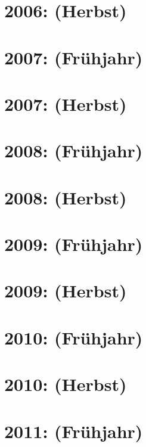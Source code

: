 \documentclass{lehramt-informatik-haupt}
\begin{document}
\section{2006: (Herbst)}


\section{2007: (Frühjahr)}


\section{2007: (Herbst)}


\section{2008: (Frühjahr)}


\section{2008: (Herbst)}


\section{2009: (Frühjahr)}


\section{2009: (Herbst)}


\section{2010: (Frühjahr)}


\section{2010: (Herbst)}


\section{2011: (Frühjahr)}

\end{document}
